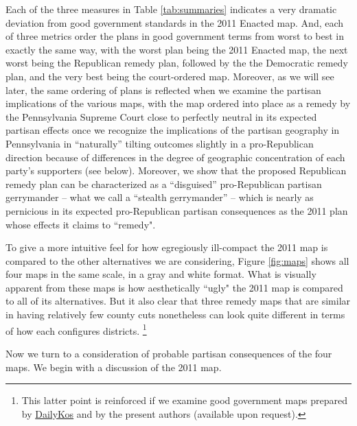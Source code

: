 \par
    Each of the three measures in Table \ref{tab:summaries} indicates a very dramatic deviation from good government standards in the 2011 Enacted map. And, each of three metrics order the plans in good government terms from worst to best in exactly the same way, with the worst plan being the 2011 Enacted map, the next worst being the Republican remedy plan, followed by the the Democratic remedy plan, and the very best being the court-ordered map. Moreover, as we will see later, the same ordering of plans is reflected when we examine the partisan implications of the various maps, with the map ordered into place as a remedy by the Pennsylvania Supreme Court close to perfectly neutral in its expected partisan effects once we recognize the implications of the partisan geography in Pennsylvania in ``naturally” tilting outcomes slightly in a pro-Republican direction because of differences in the degree of geographic concentration of each party’s supporters (see below). Moreover, we show that the proposed Republican remedy plan can be characterized as a ``disguised” pro-Republican partisan gerrymander -- what we call a ``stealth gerrymander” -- which is nearly as pernicious in its expected pro-Republican partisan consequences as the 2011 plan whose effects it claims to ``remedy".
\par
    To give a more intuitive feel for how egregiously ill-compact the 2011 map is compared to the other alternatives we are considering, Figure \ref{fig:maps} shows all four maps in the same scale, in a gray and white format. What is visually apparent from these maps is how aesthetically ``ugly" the 2011 map is compared to all of its alternatives. But it also clear that three remedy maps that are similar in having relatively few county cuts nonetheless can look quite different in terms of how each configures districts.
        \footnote{This latter point is reinforced if we examine good government maps prepared by \href{https://www.dailykos.com/stories/2018/2/8/1739648/-Pennsylvania-will-soon-redraw-its-House-map-to-end-GOP-gerrymandering-How-would-you-draw-the-lines}{DailyKos} and by the present authors (available upon request).}
%
\par
    Now we turn to a consideration of probable partisan consequences of the four maps. We begin with a discussion of the 2011 map.
\par
%

